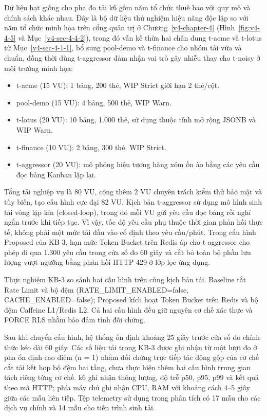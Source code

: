 
Dữ liệu hạt giống cho pha đo tải k6 gồm năm tổ chức thuê bao với quy mô và chính sách khác nhau. Đây là bộ dữ liệu thử nghiệm hiệu năng độc lập so với năm tổ chức minh họa trên cổng quản trị ở Chương~\ref{v4-chapter-4} (Hình~\ref{fig:v4-4-5} và Mục~\ref{v4-sec-4-4-2}), trong đó vẫn kế thừa hai chân dung t-acme và t-lotus từ Mục~\ref{v4-sec-4-1-1}, bổ sung pool-demo và t-finance cho nhóm tải vừa và chuẩn, đồng thời dùng t-aggressor đảm nhận vai trò gây nhiễu thay cho t-noisy ở môi trường minh họa:

\begin{itemize}
\tightlist
\item
  t-acme (15 VU): 1 bảng, 200 thẻ, WIP Strict giới hạn 2 thẻ/cột.
\item
  pool-demo (15 VU): 4 bảng, 500 thẻ, WIP Warn.
\item
  t-lotus (20 VU): 10 bảng, 1.000 thẻ, sử dụng thuộc tính mở rộng JSONB và WIP Warn.
\item
  t-finance (10 VU): 2 bảng, 300 thẻ, WIP Strict.
\item
  t-aggressor (20 VU): mô phỏng hiện tượng hàng xóm ồn ào bằng các yêu cầu đọc bảng Kanban lặp lại.
\end{itemize}

Tổng tải nghiệp vụ là 80 VU, cộng thêm 2 VU chuyên trách kiểm thử bảo mật và tùy biến, tạo cấu hình cực đại 82 VU. Kịch bản t-aggressor sử dụng mô hình sinh tải vòng lặp kín (closed-loop), trong đó mỗi VU gửi yêu cầu đọc bảng rồi nghỉ ngắn trước khi tiếp tục. Vì vậy, tốc độ yêu cầu phụ thuộc thời gian phản hồi thực tế, không phải một mức tải đầu vào cố định theo yêu cầu/phút. Trong cấu hình Proposed của KB-3, hạn mức Token Bucket trên Redis áp cho t-aggressor cho phép đi qua 1.300 yêu cầu trong cửa sổ đo 60 giây và cắt bỏ toàn bộ phần lưu lượng vượt ngưỡng bằng phản hồi HTTP 429 ở lớp lọc ứng dụng.

Thực nghiệm KB-3 so sánh hai cấu hình trên cùng kịch bản tải. Baseline tắt Rate Limit và bộ đệm (RATE\_\allowbreak{}LIMIT\_\allowbreak{}ENABLED=false, CACHE\_\allowbreak{}ENABLED=false); Proposed kích hoạt Token Bucket trên Redis và bộ đệm Caffeine L1/Redis L2. Cả hai cấu hình đều giữ nguyên cơ chế xác thực và FORCE RLS nhằm bảo đảm tính đối chứng.

Sau khi chuyển cấu hình, hệ thống ổn định khoảng 25 giây trước cửa sổ đo chính thức kéo dài 60 giây. Các số liệu tải trong KB-3 được ghi nhận từ một lượt đo ở pha ổn định cao điểm (n = 1) nhằm đối chứng trực tiếp tác động gộp của cơ chế cắt tải kết hợp bộ đệm hai tầng, chưa thực hiện thêm hai cấu hình trung gian tách riêng từng cơ chế. k6 ghi nhận thông lượng, độ trễ p50, p95, p99 và kết quả theo mã HTTP; phía máy chủ ghi nhận CPU, RAM với khoảng cách 4--5 giây giữa các mẫu liên tiếp. Tệp telemetry sử dụng trong phân tích có 17 mẫu cho các dịch vụ chính và 14 mẫu cho tiến trình sinh tải.

